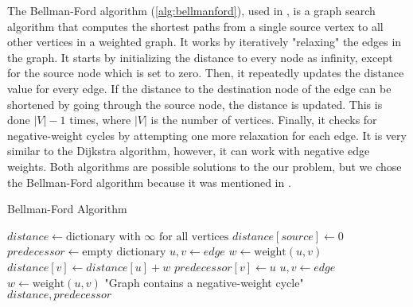 The Bellman-Ford algorithm (\ref{alg:bellmanford}), used in \texttt{}, 
is a graph search algorithm that computes 
the shortest paths from a single source vertex to all other vertices in a weighted graph.
It works by iteratively "relaxing" the edges in the graph. 
It starts by initializing the distance to every node as infinity, except for the source node which is set to zero. 
Then, it repeatedly updates the distance value for every edge. 
If the distance to the destination node of the edge can be shortened by going through the source node, the distance is updated. 
This is done $|V|-1$ times, where $|V|$ is the number of vertices. 
Finally, it checks for negative-weight cycles by attempting one more relaxation for each edge.
It is very similar to the Dijkstra algorithm, however, it can work with negative edge weights.
Both algorithms are possible solutions to the our problem, but we chose the Bellman-Ford algorithm because it was mentioned in \cite{threat_surf}.

\begin{algorithm}[h]
    \caption{Bellman-Ford Algorithm}
    \label{alg:bellmanford}
    \begin{algorithmic}[1]
        \State $distance \gets \text{dictionary with } \infty \text{ for all vertices}$
        \State $distance[source] \gets 0$
        \State $predecessor \gets \text{empty dictionary}$
                \State $u, v \gets edge$
                \State $w \gets \text{weight}(u, v)$
                    \State $distance[v] \gets distance[u] + w$
                    \State $predecessor[v] \gets u$
                \EndIf
            \EndFor
        \EndFor
            \State $u, v \gets edge$
            \State $w \gets \text{weight}(u, v)$
                \State \Return "Graph contains a negative-weight cycle"
            \EndIf
        \EndFor
        \State \Return $distance, predecessor$
    \EndProcedure
    \end{algorithmic}
\end{algorithm}